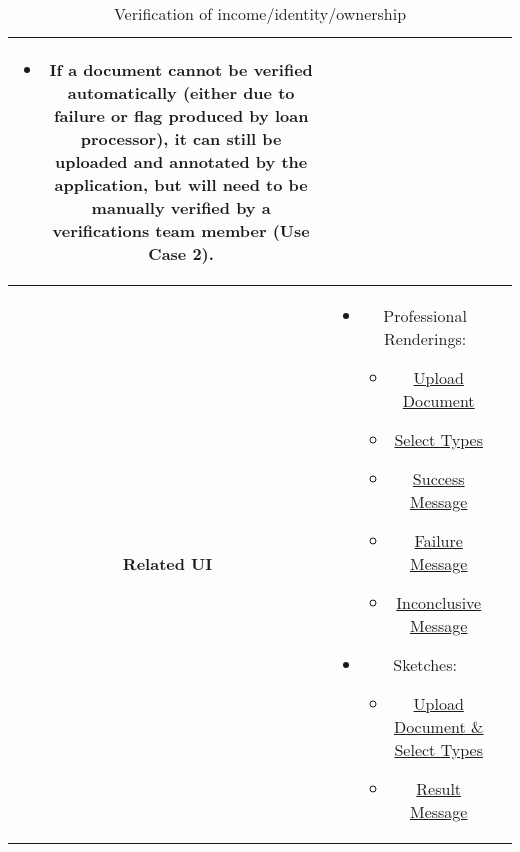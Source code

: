 \begin{table}[H]
\begin{tabularx}{0.75\linewidth}{||Sc|X||}
\begin{minipage}[l]{\linewidth}
            \begin{itemize}[wide, labelindent=0pt]
                \item If a document cannot be verified automatically (either due to failure or flag produced by loan processor), it can still be uploaded and annotated by the application, but will need to be manually verified by a verifications team member (Use Case 2).
            \end{itemize}
        \end{minipage} \\
        \hline
        \textbf{Related UI} &
        \begin{minipage}[l]{\linewidth}
            \begin{itemize}[wide, labelindent=0pt, noitemsep]
                \item Professional Renderings:
                    \begin{itemize}[noitemsep]
                        \item \href{fig:ui_2_pro}{Upload Document}
                        \item \href{fig:ui_2b_pro}{Select Types}
                        \item \href{fig:ui_2c_pro}{Success Message}
                        \item \href{fig:ui_2d_pro}{Failure Message}
                        \item \href{fig:ui_2e_pro}{Inconclusive Message}
                    \end{itemize}
                \item Sketches:
                    \begin{itemize}[noitemsep]
                        \item \href{fig:ui_2_sketch}{Upload Document \& Select Types}
                        \item \href{fig:ui_2b_sketch}{Result Message}
                    \end{itemize}
            \end{itemize}
        \end{minipage} \\
        \hline
        \hline
    \end{tabularx}
    \caption{Verification of income/identity/ownership}
    \label{tab:use_case_verification}
\end{table}
    

